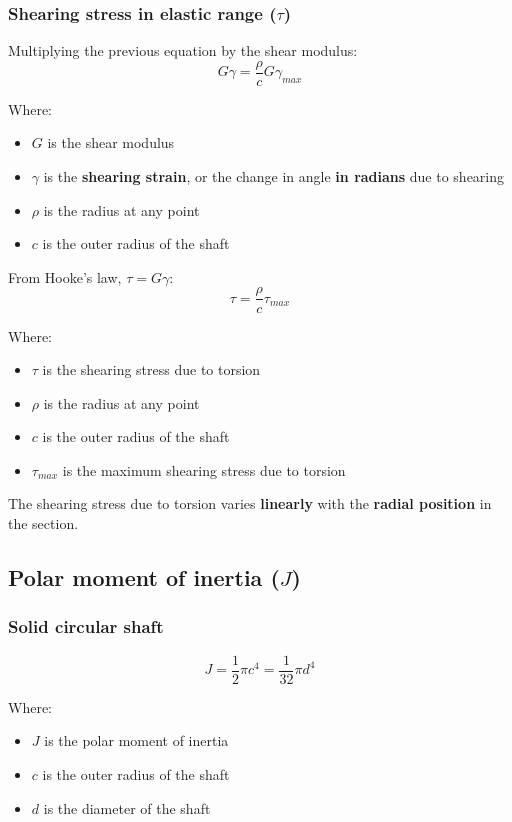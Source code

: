 \documentclass[11pt]{article}
\begin{document}
\subsubsection{Shearing stress in elastic range (\(\tau\))}
\label{sec:org94b69ac}
Multiplying the previous equation by the shear modulus:
\[G \gamma = \frac{\rho}{c} G \gamma_{max}\]

Where:
\begin{itemize}
\item \(G\) is the shear modulus
\item \(\gamma\) is the \textbf{shearing strain}, or the change in angle \textbf{in radians} due to shearing
\item \(\rho\) is the radius at any point
\item \(c\) is the outer radius of the shaft
\end{itemize}

From Hooke's law, \(\tau = G \gamma\):
\[\tau = \frac{\rho}{c} \tau_{max}\]

Where:
\begin{itemize}
\item \(\tau\) is the shearing stress due to torsion
\item \(\rho\) is the radius at any point
\item \(c\) is the outer radius of the shaft
\item \(\tau_{max}\) is the maximum shearing stress due to torsion
\end{itemize}

The shearing stress due to torsion varies \textbf{linearly} with the \textbf{radial position} in the section.

\subsection{Polar moment of inertia (\(J\))}
\label{sec:org2f9b797}

\subsubsection{Solid circular shaft}
\label{sec:orgecc9bce}
\[J = \frac{1}{2}\pi c^4 = \frac{1}{32}\pi d^4\]

Where:
\begin{itemize}
\item \(J\) is the polar moment of inertia
\item \(c\) is the outer radius of the shaft
\item \(d\) is the diameter of the shaft
\end{itemize}
\end{document}
